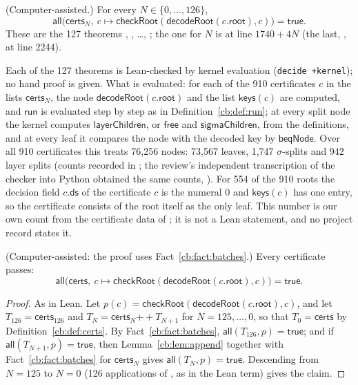 \begin{fact}\label{cb:fact:batches}
(Computer-assisted.) For every $N\in\{0,\dots,126\}$,
\[
\mathsf{all}\big(\mathsf{certs}_N,\ c\mapsto\mathsf{checkRoot}(\mathsf{decodeRoot}(c.\mathsf{root}),c)\big)=
\mathsf{true}.
\]
These are the 127 theorems , , \dots,
; the one for $N$ is at line $1740+4N$ (the last, , at line 2244).
\end{fact}

Each of the 127 theorems is Lean-checked by kernel evaluation (\texttt{decide +kernel}); no hand
proof is given. What is evaluated: for each of the 910 certificates $c$ in the lists $\mathsf{certs}_N$, the node
$\mathsf{decodeRoot}(c.\mathsf{root})$ and the list $\mathsf{keys}(c)$ are computed, and $\mathsf{run}$ is evaluated
step by step as in Definition~\ref{cb:def:run}; at every split node the kernel computes $\mathsf{layerChildren}$, or
$\mathsf{free}$ and $\mathsf{sigmaChildren}$, from the definitions, and at every leaf it compares the node with the
decoded key by $\mathsf{beqNode}$. Over all 910 certificates this treats 76{,}256 nodes: 73{,}567 leaves, 1{,}747
$\sigma$-splits and 942 layer splits (counts recorded in ; the review's independent
transcription of the checker into Python obtained the same counts, ). For
554 of the 910 roots the decision field $c.\mathsf{ds}$ of the certificate $c$ is the numeral $0$ and
$\mathsf{keys}(c)$ has one entry, so the certificate consists of the root itself as the only leaf. This number is our
own count from the certificate data of ; it is not a Lean statement, and no project record
states it.

\begin{lemma}\label{cb:lem:all-checked}
(Computer-assisted: the proof uses Fact~\ref{cb:fact:batches}.) Every certificate passes:
\[
\mathsf{all}\big(\mathsf{certs},\ c\mapsto\mathsf{checkRoot}(\mathsf{decodeRoot}(c.\mathsf{root}),c)\big)=\mathsf{true}.
\]
\end{lemma}

\begin{proof}
As in Lean. Let $p(c)=\mathsf{checkRoot}(\mathsf{decodeRoot}(c.\mathsf{root}),c)$, and let $T_{126}=\mathsf{certs}_{126}$
and $T_N=\mathsf{certs}_N\mathbin{+\!\!+}T_{N+1}$ for $N=125,\dots,0$, so that $T_0=\mathsf{certs}$ by
Definition~\ref{cb:def:certs}. By Fact~\ref{cb:fact:batches}, $\mathsf{all}(T_{126},p)=\mathsf{true}$; and if
$\mathsf{all}(T_{N+1},p)=\mathsf{true}$, then Lemma~\ref{cb:lem:append} together with Fact~\ref{cb:fact:batches} for
$\mathsf{certs}_N$ gives $\mathsf{all}(T_N,p)=\mathsf{true}$. Descending from $N=125$ to $N=0$ (126 applications of
, as in the Lean term) gives the claim.
\end{proof}

